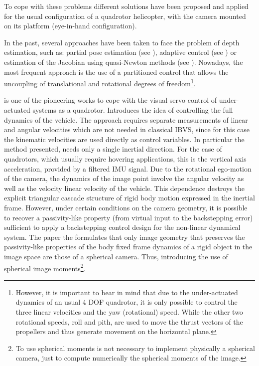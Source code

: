 To cope with these problems different solutions have been proposed and applied for the usual configuration of a quadrotor helicopter, with the camera mounted on its platform (eye-in-hand configuration).

 In the past, several approaches have been taken to face the problem of depth estimation, such as: partial pose estimation (see \cite{malis_2_1999}), adaptive control (see \cite{Papanikolopoulos}) or estimation of the Jacobian using quasi-Newton methods (see \cite{Piepmeier}). Nowadays, the most frequent approach is the use of a partitioned control that allows the uncoupling of translational and rotational degrees of freedom\footnote{However, it is important to bear in mind that due to the under-actuated dynamics of an usual 4 DOF quadrotor, it is only possible to control the three linear velocities and the yaw (rotational) speed. While the other two rotational speeds, roll and pith, are used to move the thrust vectors of the propellers and thus generate movement on the horizontal plane.}.
 
 \cite{hamel_2002} is one of the pioneering works to cope with the visual servo control of under-actuated systems as a quadrotor. Introduces the idea of controlling the full dynamics of the vehicle. The approach requires separate measurements of linear and angular velocities which are not needed in classical IBVS, since for this case the kinematic velocities are used directly as control variables. In particular the method presented, needs only a single inertial direction. For the case of quadrotors, which usually require hovering applications, this is the vertical axis acceleration, provided by a filtered IMU signal. Due to the rotational ego-motion of the camera, the dynamics of the image point involve the angular velocity as well as the velocity linear velocity of the vehicle. This dependence destroys the explicit triangular cascade structure of rigid body motion expressed in the inertial frame. However, under certain conditions on the camera geometry, it is possible to recover a passivity-like property (from virtual input to the backstepping error) sufficient to apply a backstepping control design for the non-linear dynamical system. The paper the formulates that only image geometry that preserves the passivity-like properties of the body fixed frame dynamics of a rigid object in the image space are those of a spherical camera. Thus, introducing the use of spherical image moments\footnote{To use spherical moments is not necessary to implement physically a spherical camera, just to compute numerically the spherical moments of the image.}.

